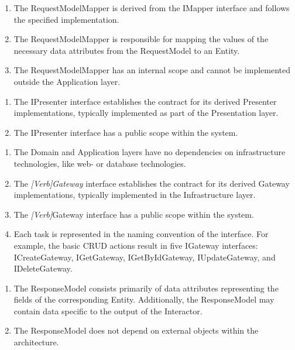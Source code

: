 \begin{enumerate}[label=\themycounter.\arabic*]
    \item The RequestModelMapper is derived from the IMapper interface and follows the
    specified implementation.
    \item The RequestModelMapper is responsible for mapping the values of the necessary
    data attributes from the RequestModel to an Entity.
    \item The RequestModelMapper has an internal scope and cannot be implemented outside
    the Application layer.
\end{enumerate}

\begin{enumerate}[label=\themycounter.\arabic*]
    \item The IPresenter interface establishes the contract for its derived Presenter
    implementations, typically implemented as part of the Presentation layer.
    \item The IPresenter interface has a public scope within the system.
\end{enumerate}

\begin{enumerate}[label=\themycounter.\arabic*]
    \item The Domain and Application layers have no dependencies on infrastructure
    technologies, like web- or database technologies.
    \item The \textit{[Verb]Gateway} interface establishes the contract for its derived
    Gateway implementations, typically implemented in the Infrastructure layer.
    \item The \textit{[Verb]}Gateway interface has a public scope within the system.
    \item Each task is represented in the naming convention of the interface. For example,
    the basic CRUD actions result in five IGateway interfaces:  ICreateGateway,
    IGetGateway, IGetByIdGateway, IUpdateGateway, and IDeleteGateway.
\end{enumerate}

\begin{enumerate}[label=\themycounter.\arabic*]
    \item The ResponseModel consists primarily of data attributes representing the fields
    of the corresponding Entity. Additionally, the ResponseModel may contain data specific
    to the output of the Interactor.
    \item The ResponseModel does not depend on external objects within the architecture.
\end{enumerate}

